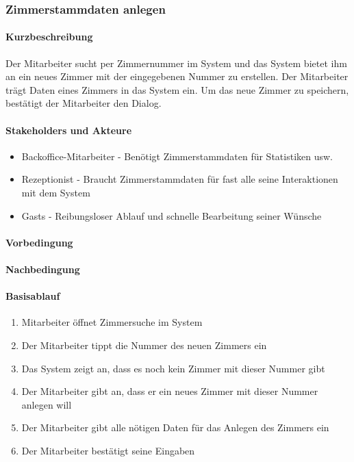 \subsubsection{Zimmerstammdaten anlegen}

\paragraph{Kurzbeschreibung}
Der Mitarbeiter sucht per Zimmernummer im System und das System bietet ihm an ein neues Zimmer mit der eingegebenen Nummer zu erstellen. Der Mitarbeiter trägt Daten eines Zimmers in das System ein. Um das neue Zimmer zu speichern, bestätigt der Mitarbeiter den Dialog.

\paragraph{Stakeholders und Akteure}
\begin{itemize}
	\item Backoffice-Mitarbeiter - Benötigt Zimmerstammdaten für Statistiken usw.
	\item \Gls{Rezeptionist} - Braucht Zimmerstammdaten für fast alle seine Interaktionen mit dem System
	\item \Glspl{Gast} - Reibungsloser Ablauf und schnelle Bearbeitung seiner Wünsche
\end{itemize}

\paragraph{Vorbedingung}


\paragraph{Nachbedingung}

\paragraph{Basisablauf}
\begin{enumerate}
	\item Mitarbeiter öffnet Zimmersuche im System
	\item Der Mitarbeiter tippt die Nummer des neuen Zimmers ein
	\item Das System zeigt an, dass es noch kein Zimmer mit dieser Nummer gibt
	\item Der Mitarbeiter gibt an, dass er ein neues Zimmer mit dieser Nummer anlegen will
	\item Der Mitarbeiter gibt alle nötigen Daten für das Anlegen des Zimmers ein
	\item Der Mitarbeiter bestätigt seine Eingaben
\end{enumerate}


